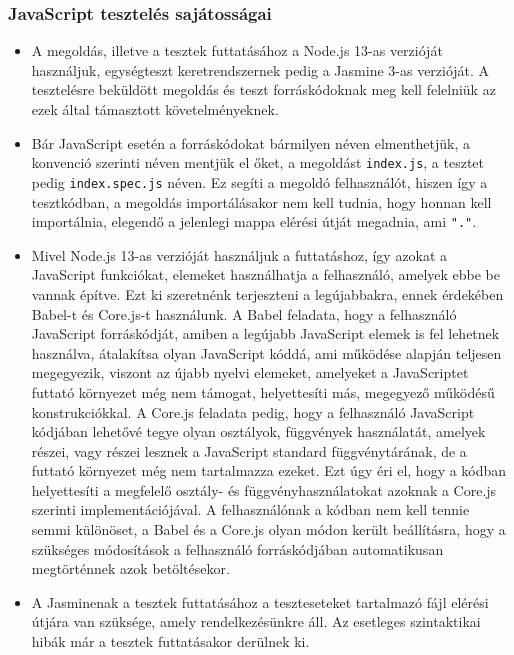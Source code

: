 \documentclass{elteikthesis}
\begin{document}
				\subsubsection{JavaScript tesztelés sajátosságai}
					\begin{itemize}
						\item A megoldás, illetve a tesztek futtatásához a Node.js 13-as verzióját használjuk, egységteszt keretrendszernek pedig a Jasmine 3-as verzióját. A tesztelésre beküldött megoldás és teszt forráskódoknak meg kell felelniük az ezek által támasztott követelményeknek.
						\item Bár JavaScript esetén a forráskódokat bármilyen néven elmenthetjük, a konvenció szerinti néven mentjük el őket, a megoldást \texttt{index.js}, a tesztet pedig \texttt{index.spec.js} néven. Ez segíti a megoldó felhasználót, hiszen így a tesztkódban, a megoldás importálásakor nem kell tudnia, hogy honnan kell importálnia, elegendő a jelenlegi mappa elérési útját megadnia, ami \texttt{"."}.
						\item Mivel Node.js 13-as verzióját használjuk a futtatáshoz, így azokat a JavaScript funkciókat, elemeket használhatja a felhasználó, amelyek ebbe be vannak építve. Ezt ki szeretnénk terjeszteni a legújabbakra, ennek érdekében Babel-t és Core.js-t használunk. A Babel feladata, hogy a felhasználó JavaScript forráskódját, amiben a legújabb JavaScript elemek is fel lehetnek használva, átalakítsa olyan JavaScript kóddá, ami működése alapján teljesen megegyezik, viszont az újabb nyelvi elemeket, amelyeket a JavaScriptet futtató környezet még nem támogat, helyettesíti más, megegyező működésű konstrukciókkal. A Core.js feladata pedig, hogy a felhasználó JavaScript kódjában lehetővé tegye olyan osztályok, függvények használatát, amelyek részei, vagy részei lesznek a JavaScript standard függvénytárának, de a futtató környezet még nem tartalmazza ezeket. Ezt úgy éri el, hogy a kódban helyettesíti a megfelelő osztály- és függvényhasználatokat azoknak a Core.js szerinti implementációjával. A felhasználónak a kódban nem kell tennie semmi különöset, a Babel és a Core.js olyan módon került beállításra, hogy a szükséges módosítások a felhasználó forráskódjában automatikusan megtörténnek azok betöltésekor.
						\item A Jasminenak a tesztek futtatásához a teszteseteket tartalmazó fájl elérési útjára van szüksége, amely rendelkezésünkre áll. Az esetleges szintaktikai hibák már a tesztek futtatásakor derülnek ki.
					\end{itemize}
\end{document}
